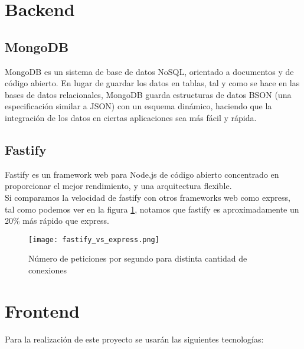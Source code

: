 \section{Backend}

\subsection{MongoDB}

MongoDB es un sistema de base de datos NoSQL, orientado a documentos y de código abierto. En lugar de guardar los datos en tablas, tal y como se hace en las bases de datos relacionales, MongoDB guarda estructuras de datos BSON (una especificación similar a JSON) con un esquema dinámico, haciendo que la integración de los datos en ciertas aplicaciones sea más fácil y rápida.

\iffalse 
    \begin{figure}
        \texttt{[image: mongodb-structure.jpg]}
        \caption{Comparación de estructura de datos entre MongoDB y los RDBMS (sistema de gestión de bases de datos relacionales)}
    \end{figure}
\fi

\subsection{Fastify}

Fastify es un framework web para Node.js de código abierto concentrado en proporcionar el mejor rendimiento, y una arquitectura flexible. \\

Si comparamos la velocidad de fastify con otros frameworks web como express, tal como podemos ver en la figura \ref{fig:fastify_vs_express}, notamos que fastify es aproximadamente un 20\% más rápido que express. \\

\begin{figure}
    \texttt{[image: fastify\_vs\_express.png]}
    \caption{ Número de peticiones por segundo para distinta cantidad de conexiones}
    \label{fig:fastify_vs_express}
\end{figure}


\section{Frontend}

    Para la realización de este proyecto se usarán las siguientes tecnologías:

